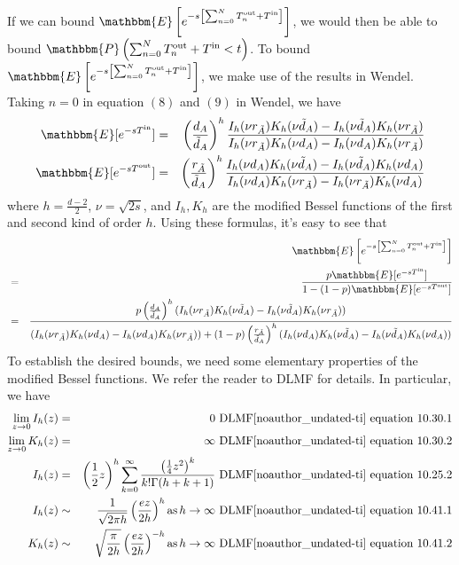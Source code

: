 \documentclass[english, aip, jcp, priprint, graphicx,floatfix]{revtex4-1}
\newcommand{\tmop}[1]{\ensuremath{\operatorname{#1}}}
\theoremstyle{plain}
\theoremstyle{definition}
\theoremstyle{plain}
\begin{document}
If we can bound $\mathbbm{E} \left[ e^{- s \left[ \sum_{n = 0}^N
T_n^{\tmop{out}} + T^{\tmop{in}} \right]} \right]$, we would then be able to
bound $\mathbbm{P} \left( \sum_{n = 0}^N T_n^{\tmop{out}} + T^{\tmop{in}} < t
\right)$. To bound $\mathbbm{E} \left[ e^{- s \left[ \sum_{n = 0}^N
T_n^{\tmop{out}} + T^{\tmop{in}} \right]} \right]$, we make use of the results
in Wendel\cite{Wendel1980-sj}. Taking $n = 0$ in equation
$(8)$ and $(9)$ in Wendel\cite{Wendel1980-sj}, we have
\begin{eqnarray*}
\mathbbm{E} [e^{- sT^{\tmop{in}}}] & = & \left( \frac{d_A}{\tilde{d}_A}
\right)^h \frac{I_h (\nu r_{\tilde{A}}) K_h (\nu \tilde{d}_A) - I_h (\nu
\tilde{d}_A) K_h (\nu r_{\tilde{A}})}{I_h (\nu r_{\tilde{A}}) K_h (\nu d_A)
- I_h (\nu d_A) K_h (\nu r_{\tilde{A}})}\\
\mathbbm{E} [e^{- sT^{\tmop{out}}}] & = & \left(
\frac{r_{\tilde{A}}}{\tilde{d}_A} \right)^h \frac{I_h (\nu d_A) K_h (\nu
\tilde{d}_A) - I_h (\nu \tilde{d}_A) K_h (\nu d_A)}{I_h (\nu d_A) K_h (\nu
r_{\tilde{A}}) - I_h (\nu r_{\tilde{A}}) K_h (\nu d_A)}
\end{eqnarray*}
where $h = \frac{d - 2}{2}$, $\nu = \sqrt{2 s}$, and $I_h, K_h$ are the
modified Bessel functions of the first and second kind of order $h$. Using
these formulas, it's easy to see that
\begin{eqnarray*}
&  & \mathbbm{E} \left[ e^{- s \left[ \sum_{n = 0}^N T_n^{\tmop{out}} +
T^{\tmop{in}} \right]} \right]\\
& = & \frac{p\mathbbm{E} [e^{- sT^{\tmop{in}}}]}{1 - (1 - p) \mathbbm{E}
[e^{- sT^{\tmop{out}}}]}\\
& = & \frac{p \left( \frac{d_A}{\tilde{d}_A} \right)^h (I_h (\nu
r_{\tilde{A}}) K_h (\nu \tilde{d}_A) - I_h (\nu \tilde{d}_A) K_h (\nu
r_{\tilde{A}}))}{(I_h (\nu r_{\tilde{A}}) K_h (\nu d_A) - I_h (\nu d_A) K_h
(\nu r_{\tilde{A}})) + (1 - p) \left( \frac{r_{\tilde{A}}}{\tilde{d}_A}
\right)^h (I_h (\nu d_A) K_h (\nu \tilde{d}_A) - I_h (\nu \tilde{d}_A) K_h
(\nu d_A))}
\end{eqnarray*}
To establish the desired bounds, we need some elementary properties of the
modified Bessel functions. We refer the reader to DLMF\cite{noauthor_undated-ti} for details. In
particular, we have
\begin{eqnarray*}
\lim_{z \rightarrow 0} I_h (z) & = & 0 \text{ DLMF\cite{noauthor_undated-ti} equation 10.30.1}\\
\lim_{z \rightarrow 0} K_h (z) & = & \infty \text{ DLMF\cite{noauthor_undated-ti} equation 10.30.2}\\
I_h (z) & = & \left( \frac{1}{2} z \right)^h \sum_{k = 0}^{\infty}
\frac{\left( \frac{1}{4} z^2 \right)^k}{k! \Gamma (h + k + 1)} \text{ DLMF\cite{noauthor_undated-ti}
equation 10.25.2}\\
I_h (z) & \sim & \frac{1}{\sqrt{2 \pi h}} \left( \frac{ez}{2 h} \right)^h
\tmop{as} h \rightarrow \infty \text{ DLMF\cite{noauthor_undated-ti} equation 10.41.1}\\
K_h (z) & \sim & \sqrt{\frac{\pi}{2 h}} \left( \frac{ez}{2 h} \right)^{- h}
\tmop{as} h \rightarrow \infty \text{ DLMF\cite{noauthor_undated-ti} equation 10.41.2}
\end{eqnarray*}
\end{document}
